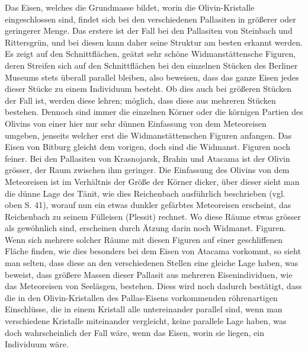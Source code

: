 \documentclass[a4paper, 11pt, oneside]{article}
\begin{document}
Das Eisen, welches die Grundmasse bildet, worin die Olivin-Kristalle eingeschlossen sind, findet sich bei den verschiedenen Pallasiten in größerer oder geringerer Menge. Das erstere ist der Fall bei den Pallasiten von Steinbach und Rittersgrün, und bei diesen kann daher seine Struktur am besten erkannt werden. Es zeigt auf den Schnittflächen, geätzt sehr schöne Widmanstättensche Figuren, deren Streifen sich auf den Schnittflächen bei den einzelnen Stücken des Berliner Museums stets überall parallel bleiben, also beweisen, dass das ganze Eisen jedes dieser Stücke zu einem Individuum besteht. Ob dies auch bei größeren Stücken der Fall ist, werden diese lehren; möglich, dass diese aus mehreren Stücken bestehen. Dennoch sind immer die einzelnen Körner oder die körnigen Partien des Olivins von einer hier nur sehr dünnen Einfassung von dem Meteoreisen umgeben, jenseits welcher erst die Widmanstättenschen Figuren anfangen. Das Eisen von Bitburg gleicht dem vorigen, doch sind die Widmanst. Figuren noch feiner. Bei den Pallasiten von Krasnojarsk, Brahin und Atacama ist der Olivin grösser, der Raum zwischen ihm geringer. Die Einfassung des Olivins von dem Meteoreisen ist im Verhältnis der Größe der Körner dicker, über dieser sieht man die dünne Lage des Tänit, wie dies Reichenbach ausführlich beschrieben (vgl. oben S. 41), worauf nun ein etwas dunkler gefärbtes Meteoreisen erscheint, das Reichenbach zu seinem Fülleisen (Plessit) rechnet. Wo diese Räume etwas grösser als gewöhnlich sind, erscheinen durch Ätzung darin noch Widmanst. Figuren. Wenn sich mehrere solcher Räume mit diesen Figuren auf einer geschliffenen Fläche finden, wie dies besonders bei dem Eisen von Atacama vorkommt, so sieht man selten, dass diese an den verschiedenen Stellen eine gleiche Lage haben, was beweist, dass größere Massen dieser Pallasit aus mehreren Eisenindividuen, wie das Meteoreisen von Seeläsgen, bestehen. Diess wird noch dadurch bestätigt, dass die in den Olivin-Kristallen des Pallas-Eisens vorkommenden röhrenartigen Einschlüsse, die in einem Kristall alle untereinander parallel sind, wenn man verschiedene Kristalle miteinander vergleicht, keine parallele Lage haben, was doch wahrscheinlich der Fall wäre, wenn das Eisen, worin sie liegen, ein Individuum wäre.
\end{document}
